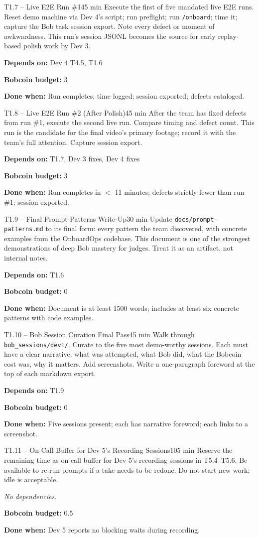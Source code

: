 \documentclass[11pt,letterpaper]{article}
\newcommand{\acceptance}[1]{\par\smallskip\textcolor{ibmgreen}{\textbf{Done when:}} #1}
\newcommand{\depends}[1]{\par\smallskip\textcolor{ibmorange}{\textbf{Depends on:}} #1}
\newcommand{\nodep}{\par\smallskip\textcolor{ibmgray}{\textit{No dependencies.}}}
\newcommand{\bobcost}[1]{\par\smallskip\textcolor{ibmaccent}{\textbf{Bobcoin budget:}} #1}
\begin{document}
\begin{task}{T1.7 -- Live E2E Run \#1}{45 min}
Execute the first of five mandated live E2E runs. Reset demo machine via Dev 4's script; run preflight; run \texttt{/onboard}; time it; capture the Bob task session export. Note every defect or moment of awkwardness. This run's session JSONL becomes the source for early replay-based polish work by Dev 3.
\depends{Dev 4 T4.5, T1.6}
\bobcost{3}
\acceptance{Run completes; time logged; session exported; defects cataloged.}
\end{task}

\begin{task}{T1.8 -- Live E2E Run \#2 (After Polish)}{45 min}
After the team has fixed defects from run \#1, execute the second live run. Compare timing and defect count. This run is the candidate for the final video's primary footage; record it with the team's full attention. Capture session export.
\depends{T1.7, Dev 3 fixes, Dev 4 fixes}
\bobcost{3}
\acceptance{Run completes in $<$ 11 minutes; defects strictly fewer than run \#1; session exported.}
\end{task}

\begin{task}{T1.9 -- Final Prompt-Patterns Write-Up}{30 min}
Update \texttt{docs/prompt-patterns.md} to its final form: every pattern the team discovered, with concrete examples from the OnboardOps codebase. This document is one of the strongest demonstrations of deep Bob mastery for judges. Treat it as an artifact, not internal notes.
\depends{T1.6}
\bobcost{0}
\acceptance{Document is at least 1500 words; includes at least six concrete patterns with code examples.}
\end{task}

\begin{task}{T1.10 -- Bob Session Curation Final Pass}{45 min}
Walk through \texttt{bob\_sessions/dev1/}. Curate to the five most demo-worthy sessions. Each must have a clear narrative: what was attempted, what Bob did, what the Bobcoin cost was, why it matters. Add screenshots. Write a one-paragraph foreword at the top of each markdown export.
\depends{T1.9}
\bobcost{0}
\acceptance{Five sessions present; each has narrative foreword; each links to a screenshot.}
\end{task}

\begin{task}{T1.11 -- On-Call Buffer for Dev 5's Recording Sessions}{105 min}
Reserve the remaining time as on-call buffer for Dev 5's recording sessions in T5.4--T5.6. Be available to re-run prompts if a take needs to be redone. Do not start new work; idle is acceptable.
\nodep
\bobcost{0.5}
\acceptance{Dev 5 reports no blocking waits during recording.}
\end{task}
\end{document}
